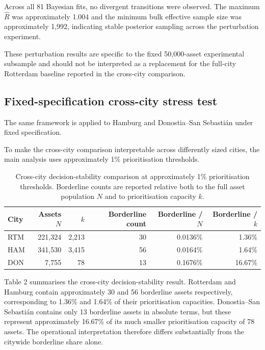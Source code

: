 \documentclass[
]{article}
\begin{document}
Across all 81 Bayesian fits, no divergent transitions were observed. The
maximum \(\hat{R}\) was approximately 1.004 and the minimum bulk
effective sample size was approximately 1,992, indicating stable
posterior sampling across the perturbation experiment.

These perturbation results are specific to the fixed 50,000-asset
experimental subsample and should not be interpreted as a replacement
for the full-city Rotterdam baseline reported in the cross-city
comparison.

\subsection{Fixed-specification cross-city stress
test}\label{fixed-specification-cross-city-stress-test}

The same framework is applied to Hamburg and Donostia--San Sebastián
under fixed specification.

To make the cross-city comparison interpretable across differently sized
cities, the main analysis uses approximately 1\% prioritisation
thresholds.

\begin{table}[H]
\centering
\small
\begin{tabular}{lrrrrr}
\toprule
City & Assets $N$ & $k$ & Borderline count & Borderline / $N$ & Borderline / $k$ \\
\midrule
RTM & 221,324 & 2,213 & 30 & 0.0136\% & 1.36\% \\
HAM & 341,530 & 3,415 & 56 & 0.0164\% & 1.64\% \\
DON & 7,755 & 78 & 13 & 0.1676\% & 16.67\% \\
\bottomrule
\end{tabular}
\caption{Cross-city decision-stability comparison at approximately 1\% prioritisation thresholds. Borderline counts are reported relative both to the full asset population \(N\) and to prioritisation capacity \(k\).}
\end{table}

Table 2 summarises the cross-city decision-stability result. Rotterdam
and Hamburg contain approximately 30 and 56 borderline assets
respectively, corresponding to 1.36\% and 1.64\% of their prioritisation
capacities. Donostia--San Sebastián contains only 13 borderline assets
in absolute terms, but these represent approximately 16.67\% of its much
smaller prioritisation capacity of 78 assets. The operational
interpretation therefore differs substantially from the citywide
borderline share alone.
\end{document}
